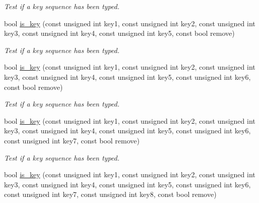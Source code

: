 \begin{DoxyCompactItemize}
\begin{DoxyCompactList}\small\item\em Test if a key sequence has been typed. \end{DoxyCompactList}\item 
\hypertarget{structcimg__library_1_1_c_img_display_aed4019277683b6e66f7b720436fa07ed}{bool \hyperlink{structcimg__library_1_1_c_img_display_aed4019277683b6e66f7b720436fa07ed}{is\-\_\-key} (const unsigned int key1, const unsigned int key2, const unsigned int key3, const unsigned int key4, const unsigned int key5, const bool remove)}\label{structcimg__library_1_1_c_img_display_aed4019277683b6e66f7b720436fa07ed}

\begin{DoxyCompactList}\small\item\em Test if a key sequence has been typed. \end{DoxyCompactList}\item 
\hypertarget{structcimg__library_1_1_c_img_display_a343e996d4bc08bc03d30c57c92ba8a4a}{bool \hyperlink{structcimg__library_1_1_c_img_display_a343e996d4bc08bc03d30c57c92ba8a4a}{is\-\_\-key} (const unsigned int key1, const unsigned int key2, const unsigned int key3, const unsigned int key4, const unsigned int key5, const unsigned int key6, const bool remove)}\label{structcimg__library_1_1_c_img_display_a343e996d4bc08bc03d30c57c92ba8a4a}

\begin{DoxyCompactList}\small\item\em Test if a key sequence has been typed. \end{DoxyCompactList}\item 
\hypertarget{structcimg__library_1_1_c_img_display_a99af418c05dfe2f4cc0a00e9306202fa}{bool \hyperlink{structcimg__library_1_1_c_img_display_a99af418c05dfe2f4cc0a00e9306202fa}{is\-\_\-key} (const unsigned int key1, const unsigned int key2, const unsigned int key3, const unsigned int key4, const unsigned int key5, const unsigned int key6, const unsigned int key7, const bool remove)}\label{structcimg__library_1_1_c_img_display_a99af418c05dfe2f4cc0a00e9306202fa}

\begin{DoxyCompactList}\small\item\em Test if a key sequence has been typed. \end{DoxyCompactList}\item 
\hypertarget{structcimg__library_1_1_c_img_display_aa61d75a8ec02241e4bde5b22854b988e}{bool \hyperlink{structcimg__library_1_1_c_img_display_aa61d75a8ec02241e4bde5b22854b988e}{is\-\_\-key} (const unsigned int key1, const unsigned int key2, const unsigned int key3, const unsigned int key4, const unsigned int key5, const unsigned int key6, const unsigned int key7, const unsigned int key8, const bool remove)}\label{structcimg__library_1_1_c_img_display_aa61d75a8ec02241e4bde5b22854b988e}


\end{DoxyCompactItemize}
